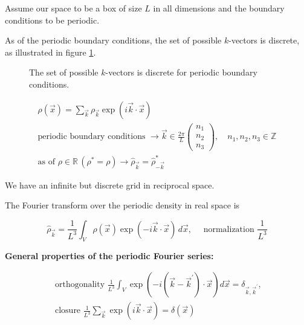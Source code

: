 Assume our space to be a box of size $L$ in all dimensions and the boundary conditions to be periodic.

As of the periodic boundary conditions, the set of possible $k$-vectors is discrete, as illustrated in figure \ref{fig:periodic_poundaries}.

\begin{figure}[ht]
    \centering
    
    \caption{The set of possible $k$-vectors is discrete for periodic boundary conditions.}
    \label{fig:periodic_poundaries}
\end{figure}

\begin{equation}
    \begin{gathered}
        \rho(\vec{x})=\sum_{\vec{k}} \rho_{\vec{k}} \exp (i \vec{k} \cdot \vec{x}) \\
        \text{periodic boundary conditions } \rightarrow \vec{k} \in \frac{2 \pi}{L}\left(\begin{array}{l}n_1 \\ n_2 \\ n_3\end{array}\right), \quad n_1, n_2, n_3 \in \mathbb{Z} \\
        \text{as of } \rho \in \mathbb{R} \, (\rho^* = \rho) \rightarrow \hat{\rho}_{\vec{k}}=\hat{\rho}_{-\vec{k}}^{*}
    \end{gathered}
\end{equation}

We have an infinite but discrete grid in reciprocal space.

The Fourier transform over the periodic density in real space is

\begin{equation}
    \label{eq:fourier_rho}
    \hat{\rho}_{\vec{k}}=\frac{1}{L^3} \int_V \rho(\vec{x}) \exp (-i \vec{k} \cdot \vec{x}) \, d \vec{x}, \quad \text { normalization } \frac{1}{L^3}
\end{equation}

\textcolor{blue1}{\textbf{General properties of the periodic Fourier series:}}

\begin{equation}
    \begin{gathered}
    \text { orthogonality } \frac{1}{L^3} \int_V \exp \left(-i\left(\vec{k}-\vec{k}^{\prime}\right) \cdot \vec{x}\right) d \vec{x}=\delta_{\vec{k}, \vec{k}^{\prime}}, \\
    \text { closure } \frac{1}{L^3} \sum_{\vec{k}} \exp (i \vec{k} \cdot \vec{x})=\delta(\vec{x})
    \end{gathered}
\end{equation}

